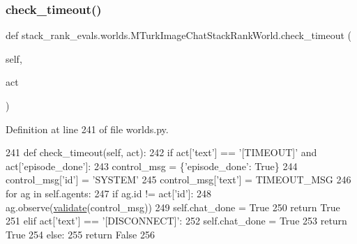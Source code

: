 \subsubsection{\texorpdfstring{check\+\_\+timeout()}{check\_timeout()}}
{\footnotesize\ttfamily def stack\+\_\+rank\+\_\+evals.\+worlds.\+M\+Turk\+Image\+Chat\+Stack\+Rank\+World.\+check\+\_\+timeout (\begin{DoxyParamCaption}\item[{}]{self,  }\item[{}]{act }\end{DoxyParamCaption})}



Definition at line 241 of file worlds.\+py.


\begin{DoxyCode}
241     \textcolor{keyword}{def }check\_timeout(self, act):
242         \textcolor{keywordflow}{if} act[\textcolor{stringliteral}{'text'}] == \textcolor{stringliteral}{'[TIMEOUT]'} \textcolor{keywordflow}{and} act[\textcolor{stringliteral}{'episode\_done'}]:
243             control\_msg = \{\textcolor{stringliteral}{'episode\_done'}: \textcolor{keyword}{True}\}
244             control\_msg[\textcolor{stringliteral}{'id'}] = \textcolor{stringliteral}{'SYSTEM'}
245             control\_msg[\textcolor{stringliteral}{'text'}] = TIMEOUT\_MSG
246             \textcolor{keywordflow}{for} ag \textcolor{keywordflow}{in} self.agents:
247                 \textcolor{keywordflow}{if} ag.id != act[\textcolor{stringliteral}{'id'}]:
248                     ag.observe(\hyperlink{namespaceparlai_1_1core_1_1worlds_afc3fad603b7bce41dbdc9cdc04a9c794}{validate}(control\_msg))
249             self.chat\_done = \textcolor{keyword}{True}
250             \textcolor{keywordflow}{return} \textcolor{keyword}{True}
251         \textcolor{keywordflow}{elif} act[\textcolor{stringliteral}{'text'}] == \textcolor{stringliteral}{'[DISCONNECT]'}:
252             self.chat\_done = \textcolor{keyword}{True}
253             \textcolor{keywordflow}{return} \textcolor{keyword}{True}
254         \textcolor{keywordflow}{else}:
255             \textcolor{keywordflow}{return} \textcolor{keyword}{False}
256 
\end{DoxyCode}
\mbox{\label{classstack__rank__evals_1_1worlds_1_1MTurkImageChatStackRankWorld_a518e69078a38528380731c4f1aa32149}} 
